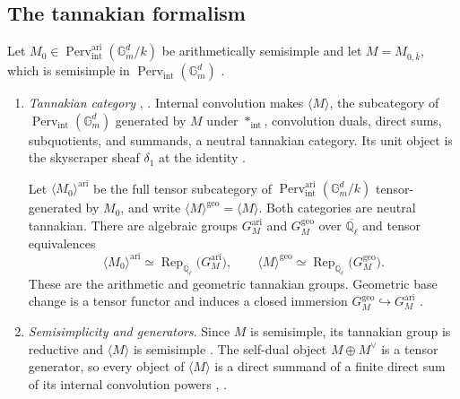 \documentclass[12pt,reqno]{amsart}
\theoremstyle{definition}
\theoremstyle{plain}
\theoremstyle{definition}
\theoremstyle{remark}
\newcommand{\bbG}{\mathbb{G}}  \newcommand{\bbH}{\mathbb{H}}
\newcommand{\bbQ}{\mathbb{Q}}  \newcommand{\bbR}{\mathbb{R}}
\newcommand{\ol}[1]{\overline{#1}}
\newcommand{\Ql}{\bbQ_{\ell}}
\newcommand{\Gm}{\bbG_m}
\newcommand{\Perv}{\operatorname{Perv}}
\begin{document}
\subsection{The tannakian formalism}
\label{sec:tannakian}

Let \(M_0\in\Perv_{\mathrm{int}}^{\mathrm{ari}}(\Gm^d/k)\) be arithmetically semisimple and let
\(M=M_{0,\bar k}\), which is semisimple in \(\Perv_{\mathrm{int}}(\Gm^d)\)
\cite[Lem.~1.28]{ForeyFresanKowalski2021}.
\begin{enumerate}[label=\textup{(T\arabic*)}, ref=\textup{(T\arabic*)}]
\item\label{item:T1} \emph{Tannakian category}
\cite[Def.~3.7.1--Th.~3.7.5]{GabberLoeser1996}, \cite[Th.~3.16]{ForeyFresanKowalski2021}.
Internal convolution makes
\(\langle M\rangle\), the subcategory of \(\Perv_{\mathrm{int}}(\Gm^d)\) generated by
\(M\) under \(\ast_{\mathrm{int}}\), convolution duals, direct sums, subquotients, and summands, a
neutral tannakian category.  Its unit object is the skyscraper sheaf \(\delta_1\) at the identity
\cite[Def.-Prop.~3.6.5, Prop.~3.7.4(ii)]{GabberLoeser1996}.

Let \(\langle M_0\rangle^{\mathrm{ari}}\) be the full tensor subcategory of
\(\Perv_{\mathrm{int}}^{\mathrm{ari}}(\Gm^d/k)\) tensor-generated by \(M_0\), and write
\(\langle M\rangle^{\mathrm{geo}}=\langle M\rangle\).  Both categories are neutral tannakian.  There are
algebraic groups \(G_M^{\mathrm{ari}}\) and \(G_M^{\mathrm{geo}}\) over \(\ol\Ql\) and tensor equivalences
\[
        \langle M_0\rangle^{\mathrm{ari}}
        \simeq\operatorname{Rep}_{\ol\Ql}\bigl(G_M^{\mathrm{ari}}\bigr),
        \qquad
        \langle M\rangle^{\mathrm{geo}}
        \simeq\operatorname{Rep}_{\ol\Ql}\bigl(G_M^{\mathrm{geo}}\bigr).
\]
These are the arithmetic and geometric tannakian groups.  Geometric base change is a tensor functor and
induces a closed immersion \(G_M^{\mathrm{geo}}\hookrightarrow G_M^{\mathrm{ari}}\)
\cite[Th.~3.30, Def.~3.31, Prop.~3.32]{ForeyFresanKowalski2021}.

\item\label{item:T2} \emph{Semisimplicity and generators}.  Since \(M\) is semisimple, its tannakian
group is reductive and \(\langle M\rangle\) is semisimple \cite[Cor.~3.19]{ForeyFresanKowalski2021}.
The self-dual object \(M\oplus M^\vee\) is a tensor generator, so every object of \(\langle M\rangle\) is
a direct summand of a finite direct sum of its internal convolution powers \cite[Prop.~3.1]{Del82},
\cite[Prop.~1.30]{ForeyFresanKowalski2021}.


\end{enumerate}
\end{document}
